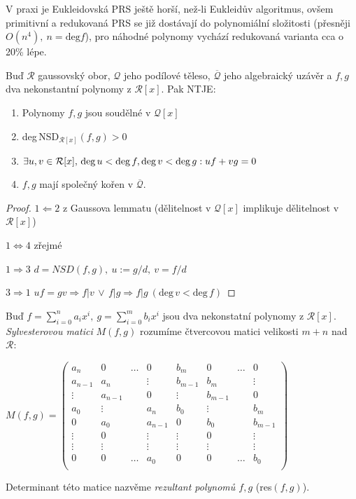 V praxi je Eukleidovská PRS ještě horší, než-li Eukleidův algoritmus, ovšem primitivní a redukovaná PRS se již dostávají do polynomiální složitosti (přesněji $O(n^4),\ n=\text{deg}f$), pro náhodné polynomy vychází redukovaná varianta cca o 20\% lépe.

\begin{thm}\label{thm:nsd}
    Buď $\mathcal{R}$ gaussovský obor, $\mathcal{Q}$ jeho podílové těleso, $\overline{\mathcal{Q}}$ jeho algebraický uzávěr a $f,g$ dva nekonstantní polynomy z $\mathcal{R}[x]$. Pak NTJE:
    \begin{enumerate}
        \item Polynomy $f,g$ jsou soudělné v $\mathcal{Q}[x]$
        \item deg\,NSD$_{\mathcal{R}[x]}(f,g)>0$
        \item $\exists u,v \in \mathcal{R}[x],\, \text{deg\,}u<\text{deg\,}f,\text{deg\,}v<\text{deg\,}g:uf+vg=0$
        \item $f,g$ mají společný kořen v $\overline{\mathcal{Q}}$.
    \end{enumerate}
    \begin{proof}
        $1\Leftarrow2$ z Gaussova lemmatu (dělitelnost v $\mathcal{Q}[x]$ implikuje dělitelnost v $\mathcal{R}[x]$)

        $1\Leftrightarrow4$ zřejmé

        $1\Rightarrow3$ $d=NSD(f,g),\ u:=g/d,\ v=f/d$

        $3\Rightarrow1$ $uf=gv \Rightarrow f|v\, \lor\, f|g \Rightarrow f|g\ (\text{deg}\,v<\text{deg}\,f)$
    \end{proof}
\end{thm}

\begin{defn}
    Buď $f=\sum_{i=0}^na_ix^i,\ g=\sum_{i=0}^mb_ix^i$ jsou dva nekonstatní polynomy z $\mathcal{R}[x]$. \textit{Sylvesterovou matici} $M(f,g)$ rozumíme čtvercovou matici velikosti $m+n$ nad $\mathcal{R}$:

    $M(f,g)=\left(
    \begin{array}{cccccccc}
        a_n & 0 & \dots & 0 & b_m & 0 & \dots & 0 \\
        a_{n-1} & a_n & & \vdots & b_{m-1} & b_m & & \vdots \\
        \vdots & a_{n-1} & & 0 & \vdots & b_{m-1} & & 0 \\
        a_0 & \vdots & & a_n & b_0 & \vdots & & b_m \\
        0 & a_0 & & a_{n-1} & 0 & b_0 & & b_{m-1} \\
        \vdots & 0 & & \vdots & \vdots & 0 & & \vdots \\
        \vdots & \vdots & & \vdots & \vdots & \vdots & & \vdots \\
        0 & 0 & \dots & a_0 & 0 & 0 & \dots & b_0 \\
    \end{array}
    \right)$

    Determinant této matice nazvěme \textit{rezultant polynomů $f,g$} (res$(f,g)$).
\end{defn}

